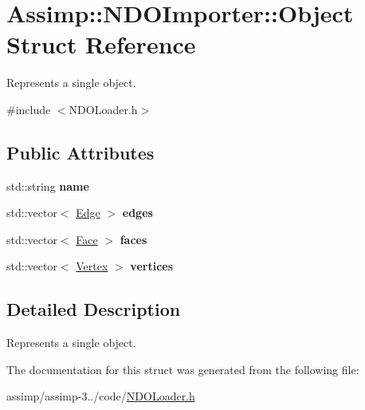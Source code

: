 \hypertarget{struct_assimp_1_1_n_d_o_importer_1_1_object}{\section{Assimp\+:\+:N\+D\+O\+Importer\+:\+:Object Struct Reference}
\label{struct_assimp_1_1_n_d_o_importer_1_1_object}
}


Represents a single object.  




{\ttfamily \#include $<$N\+D\+O\+Loader.\+h$>$}

\subsection*{Public Attributes}
\begin{DoxyCompactItemize}
\item 
\hypertarget{struct_assimp_1_1_n_d_o_importer_1_1_object_a83d3ac2efcc5215d5686808e85e394ee}{std\+::string {\bfseries name}}\label{struct_assimp_1_1_n_d_o_importer_1_1_object_a83d3ac2efcc5215d5686808e85e394ee}

\item 
\hypertarget{struct_assimp_1_1_n_d_o_importer_1_1_object_a79949e70e32329d22bb5eb0f804e07e6}{std\+::vector$<$ \hyperlink{struct_assimp_1_1_n_d_o_importer_1_1_edge}{Edge} $>$ {\bfseries edges}}\label{struct_assimp_1_1_n_d_o_importer_1_1_object_a79949e70e32329d22bb5eb0f804e07e6}

\item 
\hypertarget{struct_assimp_1_1_n_d_o_importer_1_1_object_a3ae0f4cfc2a0553ba5921c81bcba57c1}{std\+::vector$<$ \hyperlink{struct_assimp_1_1_n_d_o_importer_1_1_face}{Face} $>$ {\bfseries faces}}\label{struct_assimp_1_1_n_d_o_importer_1_1_object_a3ae0f4cfc2a0553ba5921c81bcba57c1}

\item 
\hypertarget{struct_assimp_1_1_n_d_o_importer_1_1_object_a304b15059b5c67e551fb176d6b2c7293}{std\+::vector$<$ \hyperlink{struct_assimp_1_1_n_d_o_importer_1_1_vertex}{Vertex} $>$ {\bfseries vertices}}\label{struct_assimp_1_1_n_d_o_importer_1_1_object_a304b15059b5c67e551fb176d6b2c7293}

\end{DoxyCompactItemize}


\subsection{Detailed Description}
Represents a single object. 

The documentation for this struct was generated from the following file\+:\begin{DoxyCompactItemize}
\item 
assimp/assimp-\/3../code/\hyperlink{_n_d_o_loader_8h}{N\+D\+O\+Loader.\+h}\end{DoxyCompactItemize}

